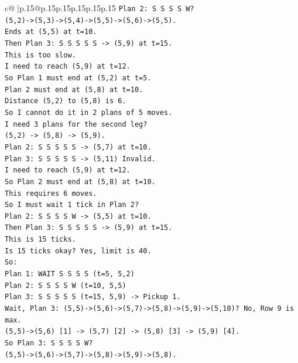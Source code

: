 \documentclass{article}
\begin{document}
{\begin{supertabular}{c@{$\;$}|p{.15\linewidth}@{}p{.15\linewidth}p{.15\linewidth}p{.15\linewidth}p{.15\linewidth}p{.15\linewidth}}
{{{\texttt{Plan 2: S S S S W?} \\
\texttt{(5,2){-}>(5,3){-}>(5,4){-}>(5,5){-}>(5,6){-}>(5,5).} \\
\texttt{Ends at (5,5) at t=10.} \\
\texttt{Then Plan 3: S S S S S {-}> (5,9) at t=15.} \\
\texttt{This is too slow.} \\
\texttt{I need to reach (5,9) at t=12.} \\
\texttt{So Plan 1 must end at (5,2) at t=5.} \\
\texttt{Plan 2 must end at (5,8) at t=10.} \\
\texttt{Distance (5,2) to (5,8) is 6.} \\
\texttt{So I cannot do it in 2 plans of 5 moves.} \\
\texttt{I need 3 plans for the second leg?} \\
\texttt{(5,2) {-}> (5,8) {-}> (5,9).} \\
\texttt{Plan 2: S S S S S {-}> (5,7) at t=10.} \\
\texttt{Plan 3: S S S S S {-}> (5,11) Invalid.} \\
\texttt{I need to reach (5,9) at t=12.} \\
\texttt{So Plan 2 must end at (5,8) at t=10.} \\
\texttt{This requires 6 moves.} \\
\texttt{So I must wait 1 tick in Plan 2?} \\
\texttt{Plan 2: S S S S W {-}> (5,5) at t=10.} \\
\texttt{Then Plan 3: S S S S S {-}> (5,9) at t=15.} \\
\texttt{This is 15 ticks.} \\
\texttt{Is 15 ticks okay? Yes, limit is 40.} \\
\texttt{So:} \\
\texttt{Plan 1: WAIT S S S S (t=5, 5,2)} \\
\texttt{Plan 2: S S S S W (t=10, 5,5)} \\
\texttt{Plan 3: S S S S S (t=15, 5,9) {-}> Pickup 1.} \\
\texttt{Wait, Plan 3: (5,5){-}>(5,6){-}>(5,7){-}>(5,8){-}>(5,9){-}>(5,10)? No, Row 9 is max.} \\
\texttt{(5,5){-}>(5,6) {[}1{]} {-}> (5,7) {[}2{]} {-}> (5,8) {[}3{]} {-}> (5,9) {[}4{]}.} \\
\texttt{So Plan 3: S S S S W?} \\
\texttt{(5,5){-}>(5,6){-}>(5,7){-}>(5,8){-}>(5,9){-}>(5,8).} \\
}}}
\end{supertabular}}
\end{document}
